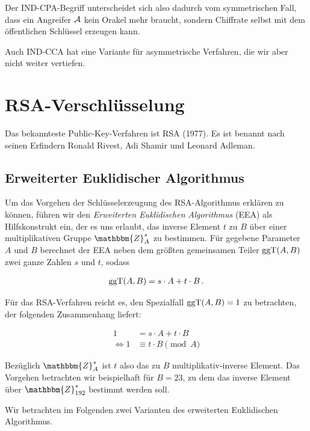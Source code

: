 Der IND-CPA-Begriff unterscheidet sich also dadurch vom symmetrischen
Fall, dass ein Angreifer $\mathcal{A}$ kein Orakel mehr braucht, sondern
Chiffrate selbst mit dem öffentlichen Schlüssel erzeugen kann.

Auch IND-CCA hat eine Variante für asymmetrische Verfahren, die wir aber
nicht weiter vertiefen.


\section{RSA-Verschlüsselung} Das bekannteste Public-Key-Verfahren ist
RSA \indexRSATextBook (1977). Es ist benannt nach seinen Erfindern
Ronald Rivest, Adi Shamir und Leonard Adleman.

\subsection{Erweiterter Euklidischer Algorithmus}
\label{ssec:eea} Um das Vorgehen der Schlüsselerzeugung des
RSA-Algorithmus erklären zu können, führen wir den \emph{Erweiterten
  Euklidischen Algorithmus} (EEA) \indexEEA als Hilfskonstrukt ein, der es
uns erlaubt, das inverse Element $t$ zu $B$ über einer multiplikativen
Gruppe $\mathbbm{Z}^{\ast}_{A}$ zu bestimmen. Für gegebene Parameter $A$
und $B$ berechnet der EEA neben dem größten gemeinsamen Teiler $\operatorname{ggT}(A,
B)$ zwei ganze Zahlen $s$ und $t$, sodass

\begin{align*} \operatorname{ggT}(A, B) = s \cdot A + t \cdot B\, .
\end{align*}

Für das RSA-Verfahren reicht es, den Spezialfall $\operatorname{ggT}(A,B) = 1$ zu
betrachten, der folgenden Zusammenhang liefert:

\begin{align*} 1 &= s \cdot A + t \cdot B\\ \Leftrightarrow 1 &\equiv t
                                                                \cdot B \pmod A
\end{align*}

Bezüglich $\mathbbm{Z}^*_{A}$ ist $t$ also das zu $B$
multiplikativ-inverse Element. Das Vorgehen betrachten wir beispielhaft
für $B = 23$, zu dem das inverse Element über $\mathbbm{Z}^{\ast}_{192}$
bestimmt werden soll.

Wir betrachten im Folgenden zwei Varianten des erweiterten Euklidischen
Algorithmus.

